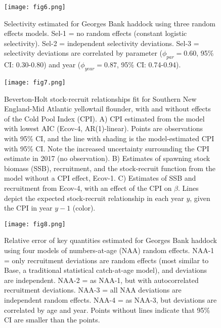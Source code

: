 \documentclass[]{article}
\begin{document}
\pagebreak

\begin{figure}

{\centering \texttt{[image: fig6.png]}

}

\caption{Selectivity estimated for Georges Bank haddock using three random effects models. Sel-1 = no random effects (constant logistic selectivity). Sel-2 = independent selectivity deviations. Sel-3 = selectivity deviations are correlated by parameter ($\phi_{par} = 0.60$, 95\% CI: 0.30-0.80) and year ($\phi_{year} = 0.87$, 95\% CI: 0.74-0.94).}\label{fig:devs-GBhaddock-sel}
\end{figure}

\pagebreak

\begin{figure}

{\centering \texttt{[image: fig7.png]}

}

\caption{Beverton-Holt stock-recruit relationships fit for Southern New England-Mid Atlantic yellowtail flounder, with and without effects of the Cold Pool Index (CPI). A) CPI estimated from the model with lowest AIC (Ecov-4, AR(1)-linear). Points are observations with 95\% CI, and the line with shading is the model-estimated CPI with 95\% CI. Note the increased uncertainty surrounding the CPI estimate in 2017 (no observation). B) Estimates of spawning stock biomass (SSB), recruitment, and the stock-recruit function from the model without a CPI effect, Ecov-1. C) Estimates of SSB and recruitment from Ecov-4, with an effect of the CPI on $\beta$. Lines depict the expected stock-recruit relationship in each year $y$, given the CPI in year $y-1$ (color).}\label{fig:devs-SNEMAYT-ecov}
\end{figure}

\pagebreak

\begin{figure}

{\centering \texttt{[image: fig8.png]}

}

\caption{Relative error of key quantities estimated for Georges Bank haddock using four models of numbers-at-age (NAA) random effects. NAA-1 = only recruitment deviations are random effects (most similar to Base, a traditional statistical catch-at-age model), and deviations are independent. NAA-2 = as NAA-1, but with autocorrelated recruitment deviations. NAA-3 = all NAA deviations are independent random effects. NAA-4 = as NAA-3, but deviations are correlated by age and year. Points without lines indicate that 95\% CI are smaller than the points.}\label{fig:rel-error-GBhaddock-naa}
\end{figure}
\end{document}
